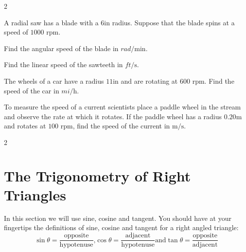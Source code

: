 \begin{description}
\begin {multicols}{2}
\item
\setlength\fboxrule{0in}\setlength\fboxsep{0.2in}

\end {multicols}

\item [65.] A radial saw has a blade with a $6 \mbox{in}$ radius. Suppose that the blade spins at a speed
of $1000$ rpm. 

\item [(a)] Find the angular
speed of the blade in $rad/\mbox{min}\text{.}$ 

\item [(b)] Find the linear
speed of the sawteeth in $ft/\mbox{s}$. 

\item [67.] The wheels of a car have
a radius $11 \mbox{in}$ and are rotating at $600$ rpm. Find the speed of the car in $mi/\mbox{h}$. 

\item [69.] To measure the speed of
a current scientists place a paddle wheel in the stream and observe the rate at which it rotates. If the paddle
wheel has a radius $0.20 \mbox{m}$ and rotates at $100$ rpm, find the speed of the current in $\mathrm{m}/\mbox{s}$. \end{description}


\columnsep =30pt
\begin {multicols}{2}
 


\end {multicols}
 

\section{The Trigonometry of Right Triangles}


In this section we will use sine, cosine and tangent. You
should have at your fingertips the definitions of sine, cosine and tangent for a right angled triangle:
\begin{equation*}\sin  \theta  =\frac{\text{opposite}}{\text{hypotenuse}}\text{,}\cos  \theta  =\frac{\text{adjacent}}{\text{hypotenuse}}\text{and}\tan  \theta  =\frac{\text{opposite}}{\text{adjacent}}
\end{equation*}

